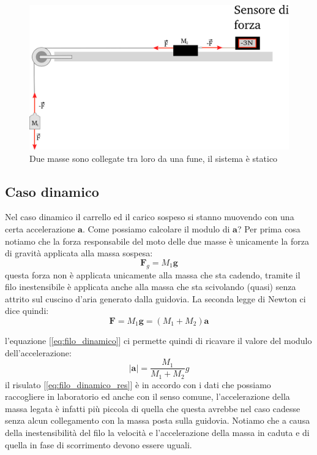 \documentclass[a4paper,10pt,oneside]{article}
\begin{document}
\begin{figure}[H]
 \centering
 \includegraphics[width=\textwidth]{../immagini/masse_filo_statico.png}
 \caption{Due masse sono collegate tra loro da una fune, il sistema è statico}
 \label{fig:filo_statico}
\end{figure}

\subsection*{Caso dinamico}

Nel caso dinamico il carrello ed il carico sospeso si stanno muovendo con una certa accelerazione $\mathbf{a}$. Come possiamo calcolare il modulo di $\mathbf{a}$?
Per prima cosa notiamo che la forza responsabile del moto delle due masse è unicamente la forza di gravità applicata alla massa sospesa:
\begin{equation}
 \mathbf{F}_g=M_1\mathbf{g}
\end{equation}
questa forza non è applicata unicamente alla massa che sta cadendo, tramite il filo inestensibile è applicata anche alla massa che sta scivolando (quasi) senza attrito sul cuscino d'aria generato dalla guidovia. La seconda legge di Newton ci dice quindi:
\begin{equation}\label{eq:filo_dinamico}
 \mathbf{F}=M_1\mathbf{g}=(M_1+M_2)\mathbf{a}
\end{equation}

l'equazione [\ref{eq:filo_dinamico}] ci permette quindi di ricavare il valore del modulo dell'accelerazione:
\begin{equation}\label{eq:filo_dinamico_res}
 |\mathbf{a}|=\frac{M_1}{M_1+M_2}g
\end{equation}
il risulato [\ref{eq:filo_dinamico_res}] è in accordo con i dati che possiamo raccogliere in laboratorio ed anche con il senso comune, l'accelerazione della massa legata è infatti più piccola di quella che questa avrebbe nel caso cadesse senza alcun collegamento con la massa posta sulla guidovia. Notiamo che a causa della inestensibilità del filo la velocità e l'accelerazione della massa in caduta e di quella in fase di scorrimento devono essere uguali.
\end{document}

